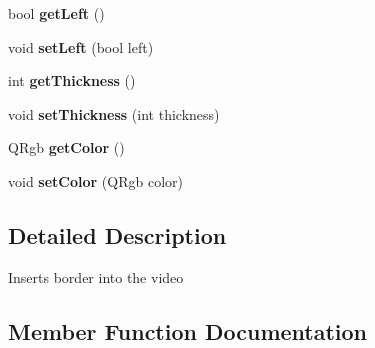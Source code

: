 \begin{DoxyCompactItemize}
\item 
\hypertarget{classModel_1_1Filter_1_1BorderFilter_afb561071d09e3b031b1d951c51e94f24}{}bool {\bfseries get\+Left} ()\label{classModel_1_1Filter_1_1BorderFilter_afb561071d09e3b031b1d951c51e94f24}

\item 
\hypertarget{classModel_1_1Filter_1_1BorderFilter_a07821fa96843dccb8ee4c9a711f1f43b}{}void {\bfseries set\+Left} (bool left)\label{classModel_1_1Filter_1_1BorderFilter_a07821fa96843dccb8ee4c9a711f1f43b}

\item 
\hypertarget{classModel_1_1Filter_1_1BorderFilter_ab6b7bfb33162f992d1bb4e8d6699abef}{}int {\bfseries get\+Thickness} ()\label{classModel_1_1Filter_1_1BorderFilter_ab6b7bfb33162f992d1bb4e8d6699abef}

\item 
\hypertarget{classModel_1_1Filter_1_1BorderFilter_ae2faef96ee1277d229d6b6988c66e6d3}{}void {\bfseries set\+Thickness} (int thickness)\label{classModel_1_1Filter_1_1BorderFilter_ae2faef96ee1277d229d6b6988c66e6d3}

\item 
\hypertarget{classModel_1_1Filter_1_1BorderFilter_ae697defefbdf5f895406269b15758d91}{}Q\+Rgb {\bfseries get\+Color} ()\label{classModel_1_1Filter_1_1BorderFilter_ae697defefbdf5f895406269b15758d91}

\item 
\hypertarget{classModel_1_1Filter_1_1BorderFilter_ad858846447f303e473dc8004ef607666}{}void {\bfseries set\+Color} (Q\+Rgb color)\label{classModel_1_1Filter_1_1BorderFilter_ad858846447f303e473dc8004ef607666}

\end{DoxyCompactItemize}


\subsection{Detailed Description}
Inserts border into the video 

\subsection{Member Function Documentation}
\hypertarget{classModel_1_1Filter_1_1BorderFilter_a2b3f7d8fcd3d774b4a2fde5914a9729f}{}
